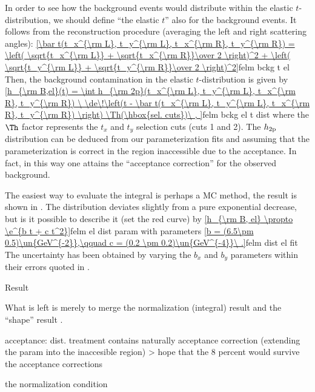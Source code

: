 In order to see how the background events would distribute within the elastic $t$-distribution, we should define ``the elastic $t$'' also for the background events. It follows from the reconstruction procedure (averaging the left and right scattering angles):
\eqref{\bar t(t_x^{\rm L}, t_y^{\rm L}, t_x^{\rm R}, t_y^{\rm R})
= \left( \sqrt{t_x^{\rm L}} + \sqrt{t_x^{\rm R}}\over 2 \right)^2 + \left( \sqrt{t_y^{\rm L}} + \sqrt{t_y^{\rm R}}\over 2 \right)^2}{felm bckg t el}
Then, the background contamination in the elastic $t$-distribution is given by
\eqref{h_{\rm B,el}(t) = \int
	h_{\rm 2p}(t_x^{\rm L}, t_y^{\rm L}, t_x^{\rm R}, t_y^{\rm R})
	\ \de\!\left(t - \bar t(t_x^{\rm L}, t_y^{\rm L}, t_x^{\rm R}, t_y^{\rm R}) \right)
	\Th(\hbox{sel. cuts})\ ,
}{felm bckg el t dist}
where the $\Th$ factor represents the $t_x$ and $t_y$ selection cuts (cuts 1 and 2). The $h_{\rm 2p}$ distribution can be deduced from our parameterization  fits and assuming that the parameterization is correct in the region inaccessible due to the acceptance. In fact, in this way one attains the ``acceptance correction'' for the observed background.


The easiest way to evaluate the integral  is perhaps a MC method, the result is shown in . The distribution deviates slightly from a pure exponential decrease, but is it possible to describe it (set the red curve) by
\eqref{h_{\rm B, el} \propto \e^{b t + c t^2}}{felm el dist param}
with parameters
\eqref{b = (6.5\pm 0.5)\un{GeV^{-2}},\qquad c = (0.2 \pm 0.2)\un{GeV^{-4}}\ .}{felm dist el fit}
The uncertainty has been obtained by varying the $b_x$ and $b_y$ parameters within their errors quoted in .

\caption{Result}

What is left is merely to merge the normalization (integral) result  and the ``shape'' result .

\> acceptance: dist. treatment contains naturally acceptance correction (extending the param into the inaccesible region)
\>> hope that the 8 percent would survive the acceptance corrections

\> the normalization condition

